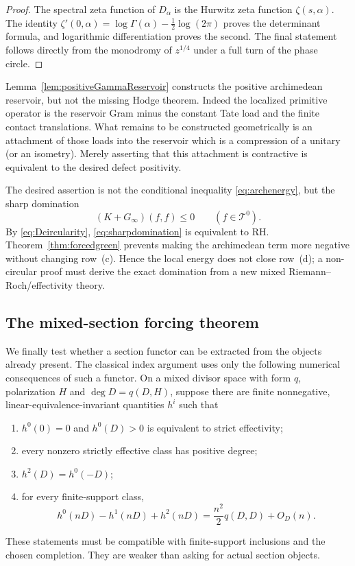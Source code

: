 \documentclass[11pt]{amsart}
\theoremstyle{definition}
\theoremstyle{remark}
\newcommand{\RH}{\mathrm{RH}}
\begin{document}
\begin{proof}
The spectral zeta function of $D_\alpha$ is the Hurwitz zeta function
\(\zeta(s,\alpha)\).  The identity
\(\zeta'(0,\alpha)=\log\Gamma(\alpha)-\frac12\log(2\pi)\) proves the
determinant formula, and logarithmic differentiation proves the second.
The final statement follows directly from the monodromy of $z^{1/4}$
under a full turn of the phase circle.
\end{proof}

Lemma~\ref{lem:positiveGammaReservoir} constructs the positive
archimedean reservoir, but not the missing Hodge theorem.  Indeed the
localized primitive operator is the reservoir Gram minus the constant Tate
load and the finite contact translations.  What remains to be constructed
geometrically is an attachment of those loads into the reservoir which is a
compression of a unitary (or an isometry).  Merely asserting that this
attachment is contractive is equivalent to the desired defect positivity.

The desired assertion is not the conditional inequality
\eqref{eq:archenergy}, but the sharp domination
\begin{equation}\label{eq:sharpdomination}
 (K+G_\infty)(f,f)\le0\qquad(f\in\mathcal T^0).
\end{equation}
By \eqref{eq:Dcircularity}, \eqref{eq:sharpdomination} is equivalent to
$\RH$.  Theorem~\ref{thm:forcedgreen} prevents making the archimedean term
more negative without changing row~(c).  Hence the local energy does not
close row~(d); a non-circular proof must derive the exact domination from a
new mixed Riemann--Roch/effectivity theory.

\subsection{The mixed-section forcing theorem}

We finally test whether a section functor can be extracted from the objects
already present.  The classical index argument uses only the following
numerical consequences of such a functor.  On a mixed divisor space with
form $q$, polarization $H$ and $\deg D=q(D,H)$, suppose there are finite
nonnegative, linear-equivalence-invariant quantities $h^i$ such that
\begin{enumerate}
\item $h^0(0)=0$ and $h^0(D)>0$ is equivalent to strict effectivity;
\item every nonzero strictly effective class has positive degree;
\item $h^2(D)=h^0(-D)$;
\item for every finite-support class,
\begin{equation}\label{eq:mixedRRminimum}
 h^0(nD)-h^1(nD)+h^2(nD)
 =\frac{n^2}{2}q(D,D)+O_D(n).
\end{equation}
\end{enumerate}
These statements must be compatible with finite-support inclusions and the
chosen completion.  They are weaker than asking for actual section objects.
\end{document}
